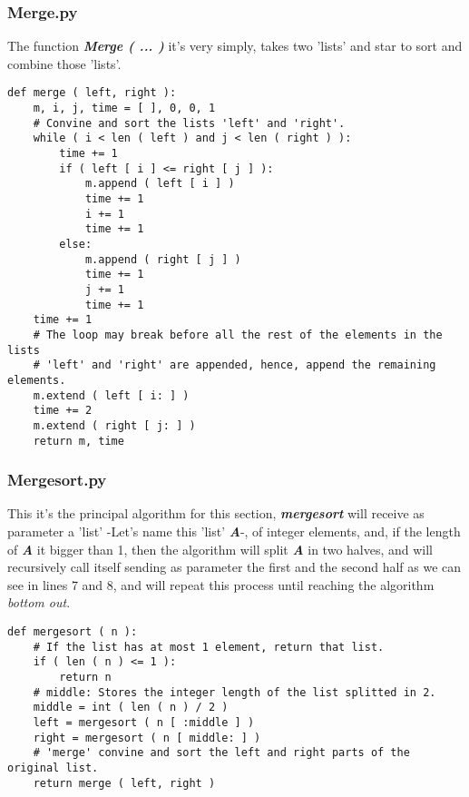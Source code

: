 \subsubsection{Merge.py}

The function {\bfseries\itshape Merge ( ... )} it's very simply, takes two 'lists' and star to sort and combine those 'lists'. \hfill \break

{\bfseries\itshape\color{armygreen}{Observation:}} {\itshape\color{armygreen}{For now we will center on this code, in section 3.2 we will calculate the temporal complexity for this algorithm. And we will explain it more thoroughly}} \hfill \break

\begin{lstlisting}
def merge ( left, right ):
    m, i, j, time = [ ], 0, 0, 1
    # Convine and sort the lists 'left' and 'right'.
    while ( i < len ( left ) and j < len ( right ) ):
        time += 1
        if ( left [ i ] <= right [ j ] ):
            m.append ( left [ i ] )
            time += 1
            i += 1
            time += 1
        else:
            m.append ( right [ j ] )
            time += 1
            j += 1
            time += 1
    time += 1
    # The loop may break before all the rest of the elements in the lists
    # 'left' and 'right' are appended, hence, append the remaining elements.
    m.extend ( left [ i: ] )
    time += 2
    m.extend ( right [ j: ] )
    return m, time
\end{lstlisting}

\pagebreak

\subsubsection{Mergesort.py}

This it's the principal algorithm for this section, {\bfseries\itshape mergesort} will receive as parameter a 'list' -Let's name this 'list' {\bfseries\itshape A}-, of integer elements, and, if the length of {\bfseries\itshape A} it bigger than 1, then the algorithm will split {\bfseries\itshape A} in two halves, and will recursively call itself sending as parameter the first and the second half as we can see in lines 7 and 8, and will repeat this process until reaching the algorithm {\itshape bottom out}. \hfill \break

\begin{lstlisting}
def mergesort ( n ):
    # If the list has at most 1 element, return that list.
    if ( len ( n ) <= 1 ):
        return n
    # middle: Stores the integer length of the list splitted in 2.
    middle = int ( len ( n ) / 2 )
    left = mergesort ( n [ :middle ] )
    right = mergesort ( n [ middle: ] )
    # 'merge' convine and sort the left and right parts of the original list.
    return merge ( left, right )
\end{lstlisting} \hfill

